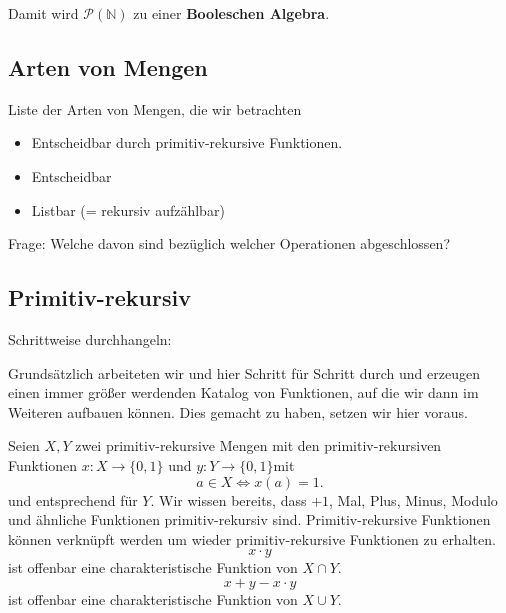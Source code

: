 \documentclass[a4paper]{amsart}
\theoremstyle{definition}
\newcommand{\N}{\ensuremath{\mathbb{ N }}}
\newcommand{\PP}{\ensuremath{\mathcal{ P }}}
\begin{document}
Damit wird $\PP(\N)$ zu einer \textbf{Booleschen Algebra}.

\subsection{Arten von Mengen}
Liste der Arten von Mengen, die wir betrachten
\begin{itemize}
   \item Entscheidbar durch primitiv-rekursive Funktionen.
   \item Entscheidbar
   \item Listbar (= rekursiv aufzählbar)
\end{itemize}

Frage: Welche davon sind bezüglich welcher Operationen abgeschlossen?

\subsection{Primitiv-rekursiv}
Schrittweise durchhangeln:

{\color{red}Grundsätzlich arbeiteten wir und hier Schritt für Schritt durch und erzeugen einen immer größer werdenden Katalog von Funktionen, auf die wir dann im Weiteren aufbauen können. Dies gemacht zu haben, setzen wir hier voraus.}

Seien $X, Y$ zwei primitiv-rekursive Mengen mit den primitiv-rekursiven Funktionen $x \colon X \to \{0, 1\}$ und $y \colon Y \to \{0, 1\}$mit
\begin{equation}\label{pr}
   a \in X \Leftrightarrow x(a) = 1.
\end{equation} 
und entsprechend für $Y$.
Wir wissen bereits, dass $+1$, Mal, Plus, Minus, Modulo und ähnliche Funktionen primitiv-rekursiv sind. Primitiv-rekursive Funktionen können verknüpft werden um wieder primitiv-rekursive Funktionen zu erhalten.
\begin{equation}\label{pSchnitt}
   x \cdot y
\end{equation}
ist offenbar eine charakteristische Funktion von $X \cap Y$.
\begin{equation}\label{pVereinigung}
   x + y - x \cdot y
\end{equation}
ist offenbar eine charakteristische Funktion von $X \cup Y$.
\end{document}
